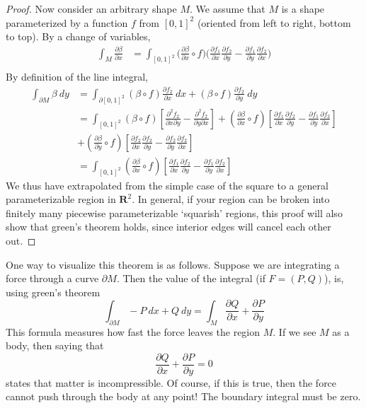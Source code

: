 \begin{proof}
    Now consider an arbitrary shape $M$. We assume that $M$ is a shape parameterized by a function $f$ from $[0,1]^2$ (oriented from left to right, bottom to top). By a change of variables,
    \begin{align*}
        \int_M \frac{\partial \beta}{\partial x} &= \int_{[0,1]^2} \bigg( \frac{\partial \beta}{\partial x} \circ f \bigg) \bigg( \frac{\partial f_1}{\partial x} \frac{\partial f_2}{\partial y} - \frac{\partial f_1}{\partial y} \frac{\partial f_2}{\partial x} \bigg)\\
    \end{align*}
    By definition of the line integral,
%
\begin{align*}
\int_{\partial M} \beta\ dy &= \int_{\partial [0,1]^2} (\beta \circ f) \frac{\partial f_2}{\partial x}\ dx + (\beta \circ f) \frac{\partial f_2}{\partial y}\ dy\\
&= \int_{[0,1]^2} (\beta \circ f) \left[\frac{\partial^2 f_2}{\partial x  \partial y} - \frac{\partial^2 f_2}{\partial y \partial x}\right] + \left( \frac{\partial \beta}{\partial x} \circ f \right) \left[ \frac{\partial f_1}{\partial x} \frac{\partial f_2}{\partial y} - \frac{\partial f_1}{\partial y} \frac{\partial f_2}{\partial x}\right]\\
&+ \left( \frac{\partial \beta}{\partial y} \circ f \right) \left[ \frac{\partial f_2}{\partial x} \frac{\partial f_2}{\partial y} - \frac{\partial f_2}{\partial y} \frac{\partial f_2}{\partial x} \right]\\
&= \int_{[0,1]^2} \left( \frac{\partial \beta}{\partial x} \circ f \right) \left[ \frac{\partial f_1}{\partial x} \frac{\partial f_2}{\partial y} - \frac{\partial f_1}{\partial y} \frac{\partial f_2}{\partial x}\right]
\end{align*}
%
    We thus have extrapolated from the simple case of the square to a general parameterizable region in $\mathbf{R}^2$. In general, if your region can be broken into finitely many piecewise parameterizable `squarish' regions, this proof will also show that green's theorem holds, since interior edges will cancel each other out.
\end{proof}

One way to visualize this theorem is as follows. Suppose we are integrating a force through a curve $\partial M$. Then the value of the integral (if $F = (P,Q)$), is, using green's theorem
%
\[ \int_{\partial M} -P\ dx + Q\ dy = \int_M \frac{\partial Q}{\partial x} + \frac{\partial P}{\partial y} \]
%
This formula measures how fast the force leaves the region $M$. If we see $M$ as a body, then saying that
\[ \frac{\partial Q}{\partial x} + \frac{\partial P}{\partial y} = 0 \]
%
states that matter is incompressible. Of course, if this is true, then the force cannot push through the body at any point! The boundary integral must be zero.

